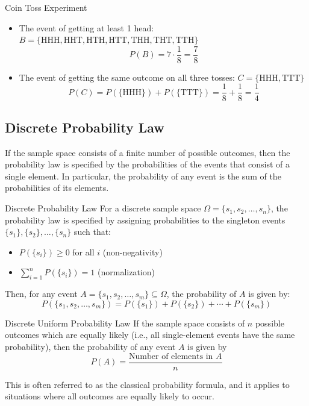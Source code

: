 \begin{itemize}
\begin{exampleboxbreak}{Coin Toss Experiment}
\begin{itemize}
    \item The event of getting at least 1 head: $B = \{\text{HHH}, \text{HHT}, \text{HTH}, \text{HTT}, \text{THH}, \text{THT}, \text{TTH}\}$
    \[P(B) = 7 \cdot \frac{1}{8} = \frac{7}{8}\]
    
    \item The event of getting the same outcome on all three tosses: $C = \{\text{HHH}, \text{TTT}\}$
    \[P(C) = P(\{\text{HHH}\}) + P(\{\text{TTT}\}) = \frac{1}{8} + \frac{1}{8} = \frac{1}{4}\]
\end{itemize}

\end{exampleboxbreak}


\subsection{Discrete Probability Law}

If the sample space consists of a finite number of possible outcomes, then the probability law is specified by the probabilities of the events that consist of a single element. In particular, the probability of any event is the sum of the probabilities of its elements.

\begin{definitionboxbreak}{Discrete Probability Law}
For a discrete sample space $\Omega = \{s_1, s_2, \ldots, s_n\}$, the probability law is specified by assigning probabilities to the singleton events $\{s_1\}, \{s_2\}, \ldots, \{s_n\}$ such that:
\begin{itemize}
    \item $P(\{s_i\}) \geq 0$ for all $i$ (non-negativity)
    \item $\sum_{i=1}^{n} P(\{s_i\}) = 1$ (normalization)
\end{itemize}
Then, for any event $A = \{s_1, s_2, \ldots, s_m\} \subseteq \Omega$, the probability of $A$ is given by:
\[P(\{s_1, s_2, \ldots, s_m\}) = P(\{s_1\}) + P(\{s_2\}) + \cdots + P(\{s_m\})\]
\end{definitionboxbreak}

\begin{definitionboxbreak}{Discrete Uniform Probability Law}
    If the sample space consists of $n$ possible outcomes which are equally likely (i.e., all single-element events have the same probability), then the probability of any event $A$ is given by
    \[P(A) = \frac{\text{Number of elements in }A}{n}\]

    This is often referred to as the classical probability formula, and it applies to situations where all outcomes are equally likely to occur.
\end{definitionboxbreak}


\end{itemize}
